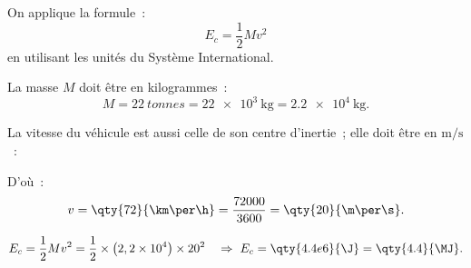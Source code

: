 On applique la formule~:
\[
    E_c=\frac{1}{2} M v^2
\]
en utilisant les unités du Système International.

La masse $M$ doit être en kilogrammes~:
\[
    M=\qty{22}{tonnes}=\qty{22e3}{\kg}=\qty{2.2e4}{\kg}.
\]

La vitesse du véhicule est aussi celle de son centre d'inertie~; elle doit être
en $\unit{\m\per\s}$~:

D'où~:
\[
    v=\qty{72}{\km\per\h}=\frac{72000}{3600}=\qty{20}{\m\per\s}.
\]

\[
    E_c=\frac{1}{2} M v^2=
    \frac{1}{2}\times\bigl(2,2 \times 10^4\bigr) \times 20^2
    \quad \Rightarrow\
    E_c=\qty{4.4e6}{\J}=\qty{4.4}{\MJ}.
\]

